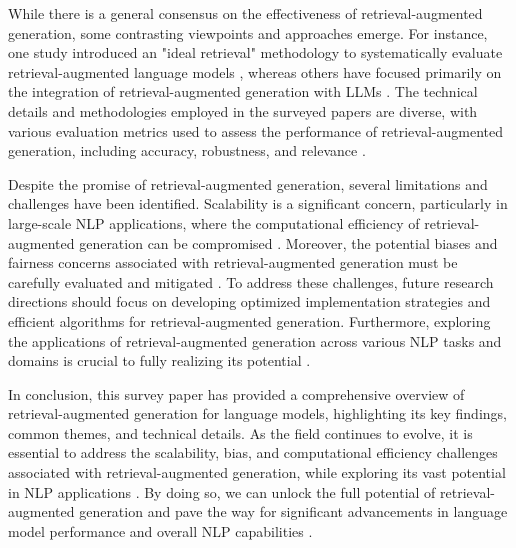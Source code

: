 \documentclass[conference]{IEEEtran}
\begin{document}
While there is a general consensus on the effectiveness of retrieval-augmented generation, some contrasting viewpoints and approaches emerge. For instance, one study introduced an "ideal retrieval" methodology to systematically evaluate retrieval-augmented language models \cite{b7}, whereas others have focused primarily on the integration of retrieval-augmented generation with LLMs \cite{b8}. The technical details and methodologies employed in the surveyed papers are diverse, with various evaluation metrics used to assess the performance of retrieval-augmented generation, including accuracy, robustness, and relevance \cite{b9}.

Despite the promise of retrieval-augmented generation, several limitations and challenges have been identified. Scalability is a significant concern, particularly in large-scale NLP applications, where the computational efficiency of retrieval-augmented generation can be compromised \cite{b10}. Moreover, the potential biases and fairness concerns associated with retrieval-augmented generation must be carefully evaluated and mitigated \cite{b11}. To address these challenges, future research directions should focus on developing optimized implementation strategies and efficient algorithms for retrieval-augmented generation. Furthermore, exploring the applications of retrieval-augmented generation across various NLP tasks and domains is crucial to fully realizing its potential \cite{b12}.

In conclusion, this survey paper has provided a comprehensive overview of retrieval-augmented generation for language models, highlighting its key findings, common themes, and technical details. As the field continues to evolve, it is essential to address the scalability, bias, and computational efficiency challenges associated with retrieval-augmented generation, while exploring its vast potential in NLP applications \cite{b13}. By doing so, we can unlock the full potential of retrieval-augmented generation and pave the way for significant advancements in language model performance and overall NLP capabilities \cite{b14}.
\end{document}
